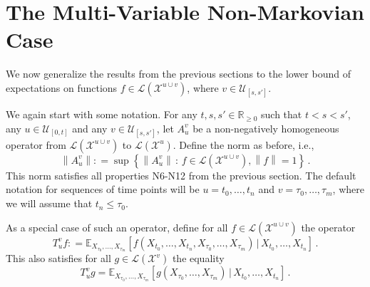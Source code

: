 \documentclass[a4paper,reqno]{amsart}
\newcommand{\reals}{\mathbb{R}}
\newcommand{\realsnonneg}{\reals_{\geq 0}}
\newcommand{\states}{\mathcal{X}}
\newcommand{\gambles}{\mathcal{L}}
\newcommand{\norm}[1]{\left\lVert #1 \right\rVert}
\newcommand{\coloneqq}{:\!=}
\begin{document}
\section{The Multi-Variable Non-Markovian Case}

We now generalize the results from the previous sections to the lower bound of expectations on functions $f\in\gambles(\states^{u\cup v})$, where $v\in\mathcal{U}_{[s,s']}$.

We again start with some notation. For any $t,s,s'\in\realsnonneg$ such that $t<s<s'$, any $u\in\mathcal{U}_{[0,t]}$ and any $v\in\mathcal{U}_{[s,s']}$, let $A_u^v$ be a non-negatively homogeneous operator from $\gambles(\states^{u\cup v})$ to $\gambles(\states^u)$. Define the norm as before, i.e.,
\begin{equation*}
\norm{A_u^v} \coloneqq \sup\left\{\norm{A_u^v}\,:\,f\in\gambles(\states^{u\cup v}), \norm{f}=1\right\}\,.
\end{equation*}
This norm satisfies all properties N6-N12 from the previous section. The default notation for sequences of time points will be $u=t_0,\ldots,t_n$ and $v=\tau_0,\ldots,\tau_m$, where we will assume that $t_n\leq \tau_0$.

As a special case of such an operator, define for all $f\in\gambles(\states^{u\cup v})$ the operator
\begin{equation*}
T_u^vf \coloneqq \mathbb{E}_{X_{\tau_0},\ldots,X_{\tau_m}}\left[f(X_{t_0},\ldots,X_{t_n},X_{\tau_0},\ldots,X_{\tau_m})\,\vert\,X_{t_0},\ldots,X_{t_n}\right]\,.
\end{equation*}
This also satisfies for all $g\in\gambles(\states^v)$ the equality
\begin{equation*}
T_u^vg = \mathbb{E}_{X_{\tau_0},\ldots,X_{\tau_m}}\left[g(X_{\tau_0},\ldots,X_{\tau_m})\,\vert\,X_{t_0},\ldots,X_{t_n}\right]\,.
\end{equation*}
\end{document}
